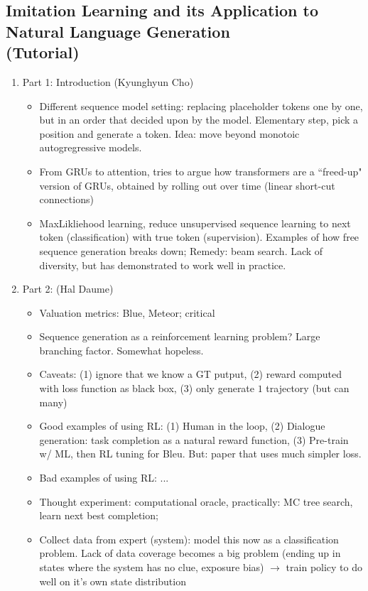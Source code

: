\documentclass[12pt,a4paper]{article}
\begin{document}
\subsection{Imitation Learning and its Application to Natural Language Generation \\(Tutorial)}
\begin{enumerate}
\item Part 1: Introduction (Kyunghyun Cho)
\begin{itemize}
\item Different sequence model setting: replacing placeholder tokens one by one, but in an order that decided upon by the model. Elementary step, pick a position and generate a token. Idea: move beyond monotoic autogregressive models. 
\item From GRUs to attention, tries to argue how transformers are a ``freed-up" version of GRUs, obtained by rolling out over time (linear short-cut connections)
\item MaxLikliehood learning, reduce unsupervised sequence learning to next token (classification) with true token (supervision). Examples of how free sequence generation breaks down; Remedy: beam search. Lack of diversity, but has demonstrated to work well in practice.
\end{itemize}
\item Part 2: (Hal Daume)
\begin{itemize}
\item Valuation metrics: Blue, Meteor; critical
\item Sequence generation as a reinforcement learning problem? Large branching factor. Somewhat hopeless.
\item Caveats: (1) ignore that we know a GT putput, (2) reward computed with loss function as black box, (3) only generate $1$ trajectory (but can 
many) 
\item Good examples of using RL: (1) Human in the loop, (2) Dialogue generation: task completion as a natural reward function, (3) Pre-train w/ ML, then RL tuning for Bleu. 	But: paper that uses much simpler loss. 
\item Bad examples of using RL: ...
\item Thought experiment: computational oracle, practically: MC tree search, learn next best completion; 
\item Collect data from expert (system): model this now as a classification problem. Lack of data coverage becomes a big problem (ending up in states where the system has no clue, exposure bias) $\to$  train policy to do well on it's own state distribution 

\end{itemize}
\end{enumerate}
\end{document}
